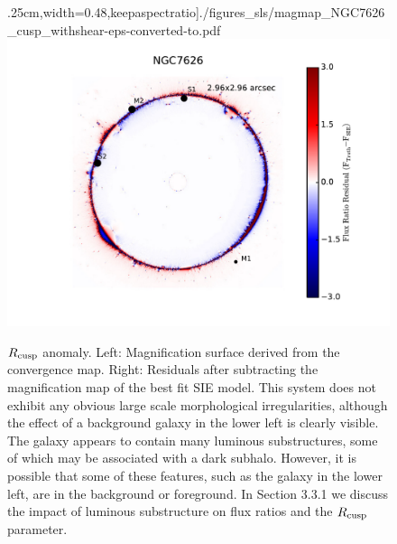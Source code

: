 \begin{itemize}
\begin{figure}
		.25cm,width=0.48\linewidth,keepaspectratio]{./figures_sls/magmap_NGC7626_cusp_withshear-eps-converted-to.pdf}
		\includegraphics[clip,trim=2.5cm .5cm 1cm
		.25cm,width=0.48\linewidth,keepaspectratio]{./figures_sls/res_map_NGC7626_cusp_withshear-eps-converted-to.pdf}
		\caption{\label{fig:magmaps_NGC7626} $R_{\rm{cusp}}$ anomaly. Left: Magnification surface derived from the convergence map. Right: Residuals after subtracting the magnification map of the best fit SIE model. This system does not exhibit any obvious large scale morphological irregularities, although the effect of a background galaxy in the lower left is clearly visible. The galaxy appears to contain many luminous substructures, some of which may be associated with a dark subhalo. However, it is possible that some of these features, such as the galaxy in the lower left, are in the background or foreground. In Section 3.3.1 we discuss the impact of luminous substructure on flux ratios and the $R_{\rm{cusp}}$ parameter.}
	\end{figure} 

\end{itemize}
